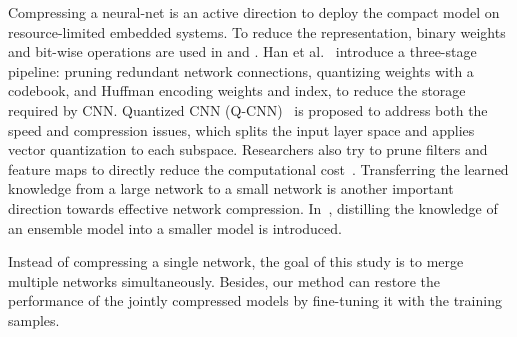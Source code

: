 \documentclass{article}
\begin{document}
	Compressing a neural-net is an active direction to deploy the compact model on resource-limited embedded systems.
	To reduce the representation, binary weights and bit-wise operations are used in %
	\cite{hubara2016binarized} and %
	\cite{rastegari2016xnor}.
	Han et al.~\cite{Han16} introduce a three-stage pipeline: pruning redundant network connections, quantizing weights with a codebook, and Huffman encoding weights and index, to reduce the storage required by CNN. %
	Quantized CNN (Q-CNN)~\cite{Wu16} is proposed to address both the speed and compression issues, which splits the input layer space and applies vector quantization to each subspace.
	Researchers also try to prune filters and feature maps to directly reduce the computational cost~\cite{molchanov2016pruning}\cite{li2016pruning}\cite{he2017channel}.
	Transferring the learned knowledge from a large network to a small network is another important direction towards effective network compression.
	In~\cite{HintonDistilling14}, distilling the knowledge of an ensemble model into a smaller model is introduced. %
	
	
	Instead of compressing a single network, the goal of this study is to merge multiple networks simultaneously.
	Besides, our method can restore the performance of the jointly compressed models by fine-tuning it with the training samples.
	
\end{document}
